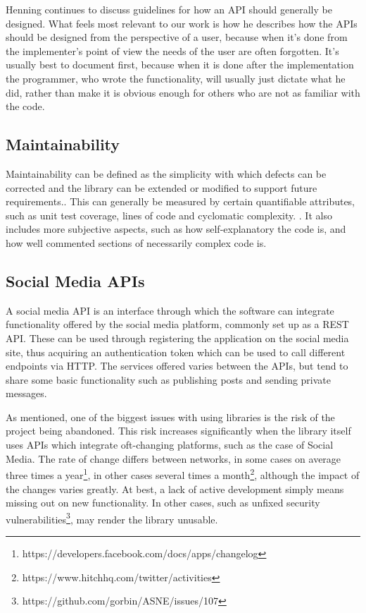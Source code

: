 \documentclass{sigchi-alternate}
\begin{document}
Henning continues to discuss guidelines for how an API should generally be designed. What feels most relevant to our work is how 
he describes how the APIs should be designed from the perspective of a user, because when it’s done from the implementer's point of view the 
needs of the user are often forgotten. It’s usually best to document first, because when it is done after the implementation the programmer, who 
wrote the functionality, will usually just dictate what he did, rather than make it is obvious enough for others who are not as familiar with the code.

\subsection{Maintainability}
Maintainability can be defined as the simplicity with which defects can be corrected and the library can be extended or modified to support future 
requirements.\autocite{5733835}. This can generally be measured by certain quantifiable attributes, such as unit test coverage, lines of code and cyclomatic complexity.
\autocite{SONARQUBE_MAINTAINABILITY_DEFINITION}. It also includes more subjective aspects, such as how self-explanatory the code is, and how well commented sections
of necessarily complex code is.

\subsection{Social Media APIs}
A social media API is an interface through which the software can integrate functionality offered by the social media platform, commonly set up as a REST API. 
These can be used through registering the application on the social media site, thus acquiring an authentication token which can be used to call different
endpoints via HTTP. The services offered varies between the APIs, but tend to share some basic functionality such as publishing posts and sending private messages.

As mentioned, one of the biggest issues with using libraries is the risk of the project being abandoned. This risk increases significantly when the library
itself uses APIs which integrate oft-changing platforms, such as the case of Social Media. The rate of change differs between networks, in some cases on average
three times a year\footnote{https://developers.facebook.com/docs/apps/changelog}, in other cases several times a month\footnote{https://www.hitchhq.com/twitter/activities},
although the impact of the changes varies greatly. At best, a lack of active development simply means missing out on new functionality. In other cases, such as 
unfixed security vulnerabilities\footnote{https://github.com/gorbin/ASNE/issues/107}, may render the library unusable.
\end{document}
